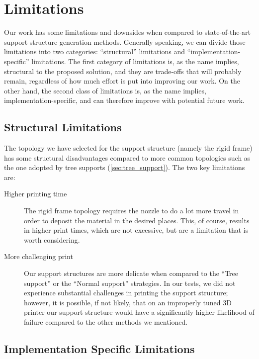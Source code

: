 \section{Limitations}

Our work has some limitations and downsides when compared to state-of-the-art support
structure generation methods. Generally speaking, we can divide those limitations
into two categories: ``structural'' limitations and ``implementation-specific'' limitations.
The first category of limitations is, as the name implies, structural to the proposed solution,
and they are trade-offs that will probably remain, regardless of how much effort is put into
improving our work. On the other hand, the second class of limitations is, as the name implies,
implementation-specific, and can therefore improve with potential future work.

\subsection{Structural Limitations}

The topology we have selected for the support structure (namely the rigid frame)
has some structural disadvantages compared to more common topologies such as the one adopted
by tree supports (\cref{sec:tree_support}).
The two key limitations are:
\begin{description}

\item[Higher printing time] The rigid frame topology requires the nozzle to do a lot more travel
in order to deposit the material in the desired places. This, of course, results in higher print times,
which are not excessive, but are a limitation that is worth considering.

\item[More challenging print] Our support structures are more delicate when compared to the ``Tree support''
or the ``Normal support'' strategies. In our tests, we did not experience substantial challenges in printing
the support structure; however, it is possible, if not likely, that on an improperly tuned 3D printer
our support structure would have a significantly higher likelihood of failure compared to the other methods
we mentioned.
    
\end{description}

\subsection{Implementation Specific Limitations}
\label{sec:imp_spec_limit}

